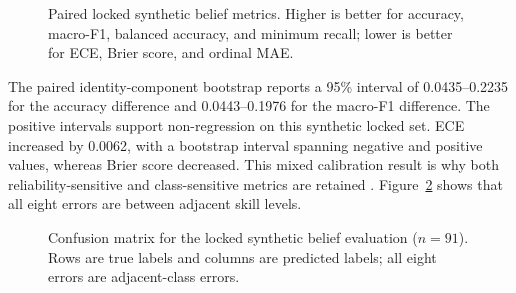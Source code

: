 \documentclass[journal]{IEEEtran}
\begin{document}
\begin{figure}[htbp]
\centering
{}
\caption{Paired locked synthetic belief metrics. Higher is better for accuracy, macro-F1, balanced accuracy, and minimum recall; lower is better for ECE, Brier score, and ordinal MAE.}
\label{fig:belief-metric-comparison}
\end{figure}

The paired identity-component bootstrap reports a 95\% interval of 0.0435--0.2235 for the accuracy difference and 0.0443--0.1976 for the macro-F1 difference. The positive intervals support non-regression on this synthetic locked set. ECE increased by 0.0062, with a bootstrap interval spanning negative and positive values, whereas Brier score decreased. This mixed calibration result is why both reliability-sensitive and class-sensitive metrics are retained \cite{guo2017calibration}. Figure~\ref{fig:belief-confusion-matrix} shows that all eight errors are between adjacent skill levels.


\begin{figure}[htbp]
\centering
{}
\caption{Confusion matrix for the locked synthetic belief evaluation ($n=91$). Rows are true labels and columns are predicted labels; all eight errors are adjacent-class errors.}
\label{fig:belief-confusion-matrix}
\end{figure}
\end{document}
